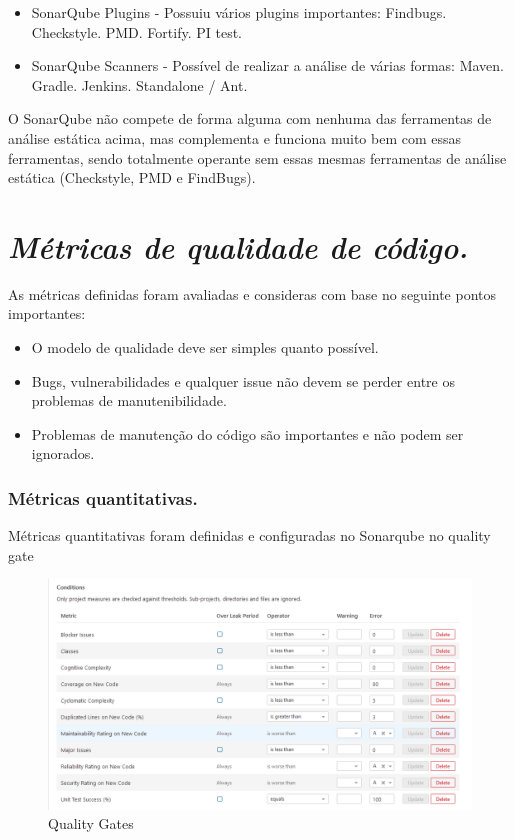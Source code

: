 \documentclass[12pt]{article}
\begin{document}
\begin{itemize}
 \item SonarQube Plugins - Possuiu vários plugins importantes:
  \subitem Findbugs.
	\subitem Checkstyle.
	\subitem PMD.
	\subitem Fortify.
	\subitem PI test.
 \item SonarQube Scanners - Possível de realizar a análise de várias formas:
	\subitem Maven\cite{MAVEN}.
	\subitem Gradle\cite{GRADLE}.
	\subitem Jenkins\cite{JENKINS}.
	\subitem Standalone / Ant\cite{ANT}.
\end{itemize}

O SonarQube não compete de forma alguma com nenhuma das ferramentas de análise estática acima, mas complementa e funciona muito bem com essas ferramentas, sendo totalmente operante sem essas mesmas ferramentas de análise estática (Checkstyle, PMD e FindBugs).

\section{\textit{Métricas de qualidade de código.}} \label{sec:managecodequality}

As métricas definidas foram avaliadas e consideras com base no seguinte pontos importantes:

 \begin{itemize}
 	\item O modelo de qualidade deve ser simples quanto possível.
 	\item Bugs, vulnerabilidades e qualquer issue não devem se perder entre os problemas de manutenibilidade.
 	\item Problemas de manutenção do código são importantes e não podem ser ignorados.
 \end{itemize}

\subsubsection{Métricas quantitativas.} \label{sec:sonar-planning-mquantity}

Métricas quantitativas foram definidas e configuradas no Sonarqube no quality gate \cite{SONAR_QUALITY_GATE}

\begin{figure}[H]
	\centering
		\includegraphics[scale=0.5]{img/sonar-quality-gates.png}
	\caption{Quality Gates}
	\label{fig:sonar-quality-gates}
\end{figure}
\end{document}
